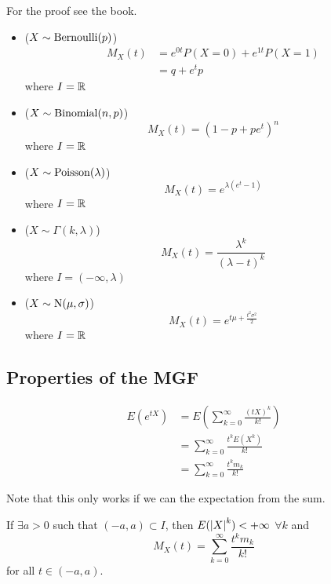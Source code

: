 \documentclass[14pt]{extarticle}
\newcommand{\Normal}{{\operatorfont N}}
\newcommand{\Poisson}{{\operatorfont Poisson}}
\begin{document}
For the proof see the book.
\begin{itemize}
    \item ($X \sim {\operatorfont Bernoulli}(p)$)
          \begin{align}
              M_X(t) & = e^{0t} P(X = 0) + e^{1t} P(X = 1) \\
                     & = q + e^t p
          \end{align}
          where $I = \mathbb{R}$
    \item ($X \sim {\operatorfont Binomial}(n, p)$)
          \begin{equation}
              M_X(t) = (1-p + p e^t)^n
          \end{equation}
          where $I = \mathbb{R}$
    \item ($X \sim \Poisson(\lambda)$)
          \begin{equation}
              M_X(t) = e^{\lambda (e^t -1)}
          \end{equation}
          where $I = \mathbb{R}$
    \item ($X \sim \Gamma(k, \lambda)$)
          \begin{equation}
              M_X(t) = \frac{\lambda^k}{(\lambda - t)^k}
          \end{equation}
          where $I = (-\infty, \lambda)$
    \item ($X \sim \Normal(\mu, \sigma)$)
          \begin{equation}
              M_X(t) = e^{t \mu + \frac{t^2 \sigma^2}{2}}
          \end{equation}
          where $I = \mathbb{R}$
\end{itemize}

\subsection{Properties of the MGF}

\begin{align}
    E(e^{tX}) & = E(\sum_{k = 0}^\infty \frac{(tX)^k}{k!})    \\
              & = \sum_{k = 0}^{\infty} \frac{t^k E(X^k)}{k!} \\
              & = \sum_{k = 0}^{\infty} \frac{t^k m_k}{k!}
\end{align}

Note that this only works if we can  the expectation from the sum.

\begin{theorem}
    If $\exists a > 0$ such that $(-a, a) \subset I$, then $E(\abs{X}^k) < +\infty$ $\forall k$ and
    \begin{equation}
        \label{eq:mgf:taylor}
        M_X(t) = \sum_{k = 0}^{\infty} \frac{t^k m_k}{k!}
    \end{equation}
    for all $t \in (-a, a)$.

\end{theorem}
\end{document}
